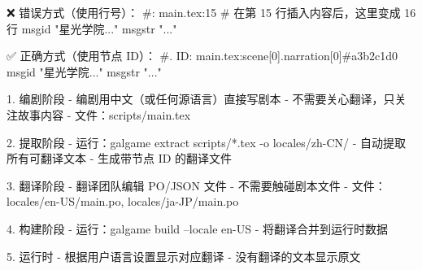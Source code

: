 ❌ 错误方式（使用行号）：
#: main.tex:15        # 在第 15 行插入内容后，这里变成 16 行
msgid "星光学院..."
msgstr "..."

✅ 正确方式（使用节点 ID）：
#. ID: main.tex:scene[0].narration[0]#a3b2c1d0
msgid "星光学院..."
msgstr "..."


1. 编剧阶段
   - 编剧用中文（或任何源语言）直接写剧本
   - 不需要关心翻译，只关注故事内容
   - 文件：scripts/main.tex

2. 提取阶段
   - 运行：galgame extract scripts/*.tex -o locales/zh-CN/
   - 自动提取所有可翻译文本
   - 生成带节点 ID 的翻译文件

3. 翻译阶段
   - 翻译团队编辑 PO/JSON 文件
   - 不需要触碰剧本文件
   - 文件：locales/en-US/main.po, locales/ja-JP/main.po

4. 构建阶段
   - 运行：galgame build --locale en-US
   - 将翻译合并到运行时数据

5. 运行时
   - 根据用户语言设置显示对应翻译
   - 没有翻译的文本显示原文
